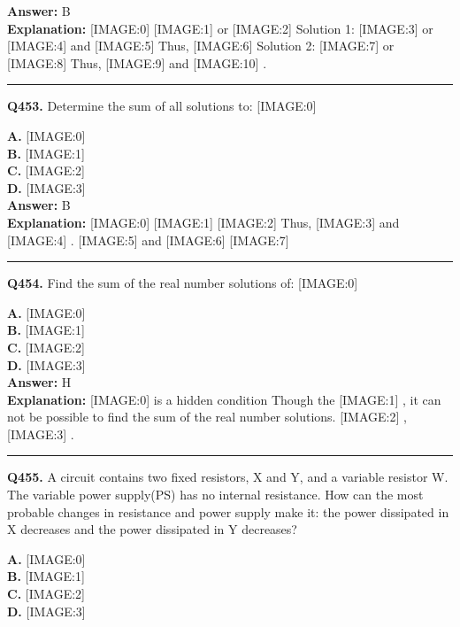\documentclass[12pt]{article}
\begin{document}
\textbf{Answer:} B \\
\textbf{Explanation:} [IMAGE:0]
[IMAGE:1]
or
[IMAGE:2]
Solution 1:
[IMAGE:3]
or
[IMAGE:4]
and
[IMAGE:5]
Thus,
[IMAGE:6]
Solution 2:
[IMAGE:7]
or
[IMAGE:8]
Thus,
[IMAGE:9]
and
[IMAGE:10]
.

\hrule
\vspace{1em}


\noindent
\textbf{Q453.} Determine the sum of all solutions to:
[IMAGE:0]



\textbf{A.} [IMAGE:0] \\
\textbf{B.} [IMAGE:1] \\
\textbf{C.} [IMAGE:2] \\
\textbf{D.} [IMAGE:3] \\

\textbf{Answer:} B \\
\textbf{Explanation:} [IMAGE:0]
[IMAGE:1]
[IMAGE:2]
Thus,
[IMAGE:3]
and
[IMAGE:4]
.
[IMAGE:5]
and
[IMAGE:6]
[IMAGE:7]

\hrule
\vspace{1em}


\noindent
\textbf{Q454.} Find the sum of the real number solutions of:
[IMAGE:0]



\textbf{A.} [IMAGE:0] \\
\textbf{B.} [IMAGE:1] \\
\textbf{C.} [IMAGE:2] \\
\textbf{D.} [IMAGE:3] \\

\textbf{Answer:} H \\
\textbf{Explanation:} [IMAGE:0]
is a hidden condition
Though the
[IMAGE:1]
, it can not be possible to find the sum of the real number solutions.
[IMAGE:2]
,
[IMAGE:3]
.

\hrule
\vspace{1em}


\noindent
\textbf{Q455.} A circuit contains two fixed resistors, X and Y, and a variable resistor W. The variable power supply(PS) has no internal resistance.
How can the most probable changes in resistance and power supply make it: the power dissipated in X decreases and the power dissipated in Y decreases?



\textbf{A.} [IMAGE:0] \\
\textbf{B.} [IMAGE:1] \\
\textbf{C.} [IMAGE:2] \\
\textbf{D.} [IMAGE:3] \\
\end{document}
